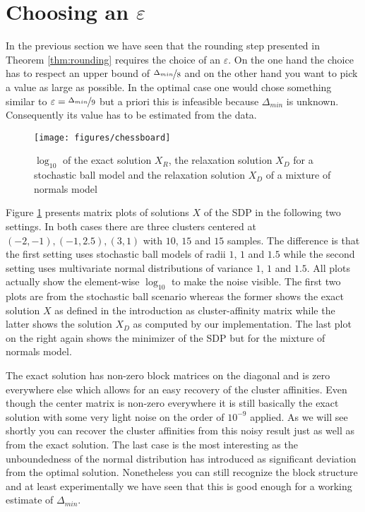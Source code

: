 \documentclass[10pt,a4paper]{article}
\begin{document}
\section{Choosing an $\varepsilon$}
\label{sec:epsilon}

In the previous section we have seen that the rounding step presented in Theorem \ref{thm:rounding} requires the choice of an $\varepsilon$.
On the one hand the choice has to respect an upper bound of $\nicefrac{\Delta_{min}}{8}$ and on the other hand you want to pick a value as large as possible.
In the optimal case one would chose something similar to $\varepsilon = \nicefrac{\Delta_{min}}{9}$ but a priori this is infeasible because $\Delta_{min}$ is unknown.
Consequently its value has to be estimated from the data.

\begin{figure}[h]
  \centering
  \texttt{[image: figures/chessboard]}
  \caption{$\log_{10}$ of the exact solution $X_{R}$, the relaxation solution $X_{D}$ for a stochastic ball model and the relaxation solution $X_{D}$ of a mixture of normals model}
  \label{fig:chessboard}
\end{figure}

Figure \ref{fig:chessboard} presents matrix plots of solutions $X$ of the SDP in the following two settings.
In both cases there are three clusters centered at $(-2, -1), (-1, 2.5), (3, 1)$ with $10$, $15$ and $15$ samples.
The difference is that the first setting uses stochastic ball models of radii $1$, $1$ and $1.5$ while the second setting uses multivariate normal distributions of variance $1$, $1$ and $1.5$.
All plots actually show the element-wise $\log_{10}$ to make the noise visible.
The first two plots are from the stochastic ball scenario whereas the former shows the exact solution $X$ as defined in the introduction as cluster-affinity matrix while the latter shows the solution $X_{D}$ as computed by our implementation.
The last plot on the right again shows the minimizer of the SDP but for the mixture of normals model.

The exact solution has non-zero block matrices on the diagonal and is zero everywhere else which allows for an easy recovery of the cluster affinities.
Even though the center matrix is non-zero everywhere it is still basically the exact solution with some very light noise on the order of $10^{-9}$ applied.
As we will see shortly you can recover the cluster affinities from this noisy result just as well as from the exact solution.
The last case is the most interesting as the unboundedness of the normal distribution has introduced as significant deviation from the optimal solution.
Nonetheless you can still recognize the block structure and at least experimentally we have seen that this is good enough for a working estimate of $\Delta_{min}$.
\end{document}
